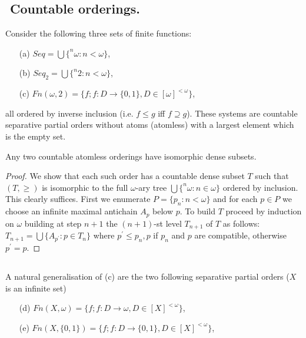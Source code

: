 
\subsection{${}$ \hspace{-1em}Countable orderings.}\label{ctble-orderings}

Consider the following three sets of finite functions:
\begin{itemize}\label{defFn}
 \item[(a)]  $Seq = \bigcup\{ ^n\omega:n<\omega\}$,
 \item[(b)]  $Seq_2 = \bigcup\{ ^n2:n<\omega\}$,
 \item[(c)]  $Fn(\omega,2)=\{f;f:D\to\{0,1\},D\in[\omega]^{<\omega}\}$,
\end{itemize}
all ordered by inverse inclusion (i.e. $f\leq g$ iff $f\supseteq g$). These systems are countable separative partial orders without atoms (atomless) with
a largest element which is the empty set.


\begin{proposition}\label{countable-isom-dense}
 Any two countable atomless orderings have isomorphic dense subsets.
\end{proposition}

\begin{proof}
We show that each such order has a countable dense subset $T$ such that $(T,\geq)$ is isomorphic to the full $\omega$-ary tree
$\bigcup\{ ^n\omega : n\in\omega\}$ ordered by inclusion. This clearly suffices. First we enumerate $P=\{p_n:n<\omega\}$ and
for each $p\in P$ we choose an infinite maximal antichain $A_p$ below $p$. To build $T$ proceed by induction on $\omega$ building at step
$n+1$ the $(n+1)$-st level $T_{n+1}$ of $T$ as follows: $T_{n+1}=\bigcup\{A_{p^\prime}:p\in T_n\}$ where $p^\prime\leq p_n, p$ if $p_n$ and
$p$ are compatible, otherwise $p^\prime=p$.
\end{proof}

\subsection{} A natural generalisation of (c) are the two following separative partial orders ($X$ is an infinite set)

\begin{itemize}
 \item[(d)] $Fn(X,\omega)=\{f;f:D\to\omega,D\in[X]^{<\omega}\}$,
 \item[(e)] $Fn(X,\{0,1\})=\{f;f:D\to\{0,1\},D\in[X]^{<\omega}\}$,
\end{itemize}

